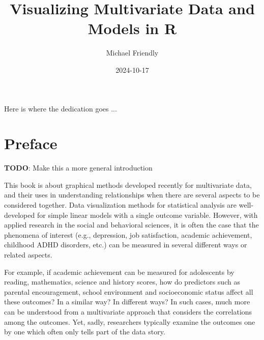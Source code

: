 \documentclass[
  letterpaper,
  10pt,
  krantz2]{krantz}
\title{Visualizing Multivariate Data and Models in R}
\author{Michael Friendly}
\date{2024-10-17}
\renewcommand*\contentsname{Table of contents}
\newcommand\contentsname{Table of contents}
\begin{document}

\maketitle


\thispagestyle{empty}

\begin{center}
Here is where the dedication goes ...
\end{center}

\setlength{\abovedisplayskip}{-5pt}
\setlength{\abovedisplayshortskip}{-5pt}

\renewcommand*\contentsname{Table of contents}
{
\hypersetup{linkcolor=}
\setcounter{tocdepth}{2}
\tableofcontents
}


\chapter*{Preface}\label{preface}


\textbf{TODO}: Make this a more general introduction

This book is about graphical methods developed recently for multivariate
data, and their uses in understanding relationships when there are
several aspects to be considered together. Data visualization methods
for statistical analysis are well-developed for simple linear models
with a single outcome variable. However, with applied research in the
social and behavioral sciences, it is often the case that the phenomena
of interest (e.g., depression, job satisfaction, academic achievement,
childhood ADHD disorders, etc.) can be measured in several different
ways or related aspects.

For example, if academic achievement can be measured for adolescents by
reading, mathematics, science and history scores, how do predictors such
as parental encouragement, school environment and socioeconomic status
affect all these outcomes? In a similar way? In different ways? In such
cases, much more can be understood from a multivariate approach that
considers the correlations among the outcomes. Yet, sadly, researchers
typically examine the outcomes one by one which often only tells part of
the data story.
\end{document}
